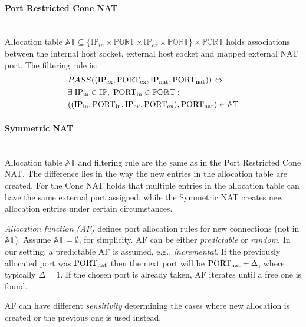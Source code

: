 \documentclass{llncs}
\begin{document}
\paragraph{Port Restricted Cone NAT} ~\\
Allocation table $\mathbb{AT} \subseteq \{\mathbb{IP}_{in} \times \mathbb{PORT} \times \mathbb{IP}_{ex} \times \mathbb{PORT}\} \times \mathbb{PORT}$ 
holds associations between the internal host socket, external host socket and mapped external NAT port. 
The filtering rule is:
\begin{align*}
& PASS((\text{IP\textsubscript{ex}}, \text{PORT\textsubscript{ex}}, \text{IP\textsubscript{nat}}, \text{PORT\textsubscript{nat}} )) \Leftrightarrow \\
&  \exists \; \text{IP\textsubscript{in}} \in \mathbb{IP}, \; \text{PORT\textsubscript{in}} \in \mathbb{PORT}:\\
& ((\text{IP\textsubscript{in}}, \text{PORT\textsubscript{in}}, \text{IP\textsubscript{ex}}, \text{PORT\textsubscript{ex}}), \text{PORT\textsubscript{nat}} ) \in \mathbb{AT}
\end{align*}

\paragraph{Symmetric NAT} ~\\
Allocation table $\mathbb{AT}$ and filtering rule are the same as in the Port Restricted Cone NAT. The difference lies in the way 
the new entries in the allocation table are created. For the Cone NAT holds that multiple entries in the allocation table 
can have the same external port assigned, while the Symmetric NAT creates new allocation entries under certain circumstances.

\emph{Allocation function (AF)} defines port allocation rules for new connections (not in $\mathbb{AT}$). Assume $\mathbb{AT}=\emptyset$, for simplicity. 
AF can be either \emph{predictable} or \emph{random}. In our setting, a predictable AF is assumed, e.g., \emph{incremental}. 
If the previously allocated port was $\text{PORT\textsubscript{nat}}$ then
the next port will be $\text{PORT\textsubscript{nat}}+\Delta$, where typically $\Delta=1$.
If the chosen port is already taken, AF iterates until a free one is found.

AF can have different \emph{sensitivity} determining the cases where new allocation is created or the previous one is used instead.
\end{document}
